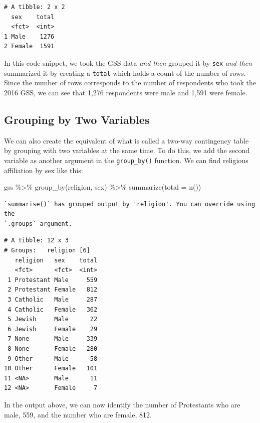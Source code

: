 \documentclass[
  letterpaper,
]{book}
\newenvironment{Shaded}{\begin{snugshade}}{\end{snugshade}}
\newcommand{\AttributeTok}[1]{\textcolor[rgb]{0.40,0.45,0.13}{#1}}
\newcommand{\FunctionTok}[1]{\textcolor[rgb]{0.28,0.35,0.67}{#1}}
\newcommand{\NormalTok}[1]{\textcolor[rgb]{0.00,0.23,0.31}{#1}}
\newcommand{\SpecialCharTok}[1]{\textcolor[rgb]{0.37,0.37,0.37}{#1}}
\begin{document}
\begin{verbatim}
# A tibble: 2 x 2
  sex    total
  <fct>  <int>
1 Male    1276
2 Female  1591
\end{verbatim}

In this code snippet, we took the GSS data \emph{and then} grouped it by
\texttt{sex} \emph{and then} summarized it by creating a \texttt{total}
which holds a count of the number of rows. Since the number of rows
corresponds to the number of respondents who took the 2016 GSS, we can
see that 1,276 respondents were male and 1,591 were female.

\hypertarget{grouping-by-two-variables}{%
\subsection{Grouping by Two Variables}\label{grouping-by-two-variables}}

We can also create the equivalent of what is called a two-way
contingency table by grouping with two variables at the same time. To do
this, we add the second variable as another argument in the
\texttt{group\_by()} function. We can find religious affiliation by sex
like this:

\begin{Shaded}
\begin{Highlighting}[]
\NormalTok{gss }\SpecialCharTok{\%\textgreater{}\%}
  \FunctionTok{group\_by}\NormalTok{(religion, sex) }\SpecialCharTok{\%\textgreater{}\%}
  \FunctionTok{summarize}\NormalTok{(}\AttributeTok{total =} \FunctionTok{n}\NormalTok{())}
\end{Highlighting}
\end{Shaded}

\begin{verbatim}
`summarise()` has grouped output by 'religion'. You can override using the
`.groups` argument.
\end{verbatim}

\begin{verbatim}
# A tibble: 12 x 3
# Groups:   religion [6]
   religion   sex    total
   <fct>      <fct>  <int>
 1 Protestant Male     559
 2 Protestant Female   812
 3 Catholic   Male     287
 4 Catholic   Female   362
 5 Jewish     Male      22
 6 Jewish     Female    29
 7 None       Male     339
 8 None       Female   280
 9 Other      Male      58
10 Other      Female   101
11 <NA>       Male      11
12 <NA>       Female     7
\end{verbatim}

In the output above, we can now identify the number of Protestants who
are male, 559, and the number who are female, 812.
\end{document}
